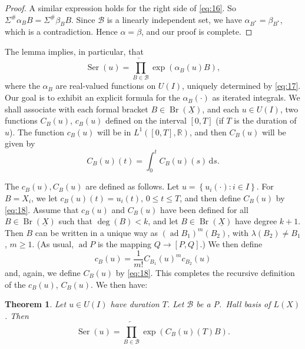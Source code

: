 \documentclass[leqno]{article}
\theoremstyle{plain}
\newtheorem*{theorem*}{Theorem}
\newcommand{\dd}{\,\mathrm{d}}
\newcommand{\Br}{\operatorname{Br}(\underline{X})}
\newcommand{\Ser}{\operatorname{Ser}}
\begin{document}
\begin{proof}
	A similar expression holds for the right side of \eqref{eq:16}. So $\Sigma^{\#} \alpha_{B} B=\Sigma^{\#} \beta_{B} B$. 
	Since $\mathcal{B}$ is a linearly independent set, we have $\alpha_{B^*} = \beta_{B^*}$, which is a contradiction. 
	Hence $\alpha=\beta$, and our proof is complete.
\end{proof}

The lemma implies, in particular, that
\begin{equation} \label{eq:17}
	\Ser(u) = \overleftarrow{\prod_{B \in \mathcal{B}}} \exp(\alpha_B(u)B),
\end{equation}
where the $\alpha_{B}$ are real-valued functions on $U(I)$, uniquely determined by \eqref{eq:17}. 
Our goal is to exhibit an explicit formula for the $\alpha_{B}(\cdot)$ as iterated integrals. 
We shall associate with each formal bracket $B \in \Br$, and each $u \in U(I)$, two functions $C_B(u)$, $c_B(u)$ defined on the interval $[0,T]$ (if $T$ is the duration of $u$). 
The function $c_B(u)$ will be in $L^1([0,T],\mathbb{R})$, and then $C_B(u)$ will be given by
\begin{equation}
	\label{eq:18}
	C_{B}(u)(t)=\int_{0}^{t} C_{B}(u)(s) \dd s.
\end{equation}

The $c_{B}(u), C_{B}(u)$ are defined as follows. Let $u=\left\{u_{i}(\cdot): i \in I\right\}$. 
For $B=X_{i}$, we let $c_{B}(u)(t)=u_{i}(t)$, $0 \leq t \leq T$, and then define $C_{B}(u)$ by \eqref{eq:18}. 
Assume that $c_{B}(u)$ and $C_{B}(u)$ have been defined for all $B \in \Br$ such that $\operatorname{deg}(B)<k$, and let $B \in \Br$ have degree $k+1$. 
Then $B$ can be written in a unique way as $(\operatorname{ad} B_1)^m (B_2)$, with $\lambda\left(B_{2}\right) \neq B_1$, $m \geq 1$.
(As usual, $\operatorname{ad} P$ is the mapping $Q \to [P, Q]$.)
We then define
\begin{equation} \label{eq:19}
	c_{B}(u)=\frac{1}{m !} C_{B_{1}}(u)^{m} c_{B_{2}}(u)
\end{equation}
and, again, we define $C_{B}(u)$ by \eqref{eq:18}. 
This completes the recursive definition of the $c_{B}(u)$, $C_{B}(u)$. We then have:

\begin{theorem*}
	Let $u \in U(I)$ have duration $T$. 
	Let $\mathcal{B}$ be a P.\ Hall basis of $L(X)$.
	Then
	\begin{equation} \label{eq:20}
		\Ser(u) = \overleftarrow{\prod_{B \in \mathcal{B}}} \exp \left(C_B(u)(T) B\right).
	\end{equation}
\end{theorem*}
\end{document}
